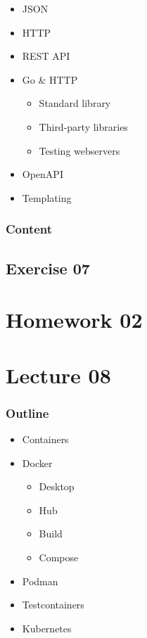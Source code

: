 \documentclass[
  digital,
  color,
  oneside,
  nosansbold,
  nocolorbold,
  lof,
  lot,
]{fithesis4}
\begin{document}
\begin{itemize}
    \item JSON
    \item HTTP
    \item REST API
    \item Go \& HTTP
    \begin{itemize}
        \item Standard library
        \item Third-party libraries
        \item Testing webservers
    \end{itemize}
    \item OpenAPI
    \item Templating
\end{itemize}

\subsubsection{Content}

\subsection{Exercise 07}

\section{Homework 02}

\section{Lecture 08}

\subsubsection{Outline}

\begin{itemize}
    \item Containers
    \item Docker
    \begin{itemize}
        \item Desktop
        \item Hub
        \item Build
        \item Compose
    \end{itemize}
    \item Podman
    \item Testcontainers
    \item Kubernetes
\end{itemize}
\end{document}
